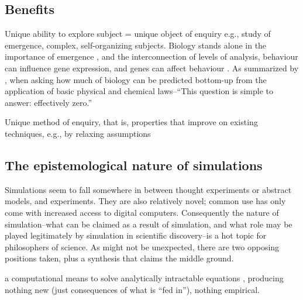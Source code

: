 
\subsection{Benefits}\label{benefits}

Unique ability to explore subject = unique object of enquiry e.g., study
of emergence, complex, self-organizing subjects. Biology stands alone in
the importance of emergence \autocite{Bersini:2006ve}, and the
interconnection of levels of analysis, \eg behaviour can influence gene
expression, and genes can affect behaviour \autocite{Krakauer2011}. As
summarized by \autocite{Krakauer2011}, when asking how much of biology
can be predicted bottom-up from the application of basic physical and
chemical laws--``This question is simple to answer: effectively zero.''

Unique method of enquiry, that is, properties that improve on existing
techniques, e.g., by relaxing assumptions

\subsection{The epistemological nature of simulations}\label{the-epistemological-nature-of-simulations}

Simulations seem to fall somewhere in between thought experiments or
abstract models, and experiments. They are also relatively novel; common
use has only come with increased access to digital computers.
Consequently the nature of simulation--what can be claimed as a result
of simulation, and what role may be played legitimately by simulation in
scientific discovery--is a hot topic for philosophers of science. As
might not be unexpected, there are two opposing positions taken, plus a
synthesis that claims the middle ground.

\label{simulations-are-just-calculators}

a computational means to solve analytically intractable equations
\autocite[31]{Winsberg2010}, producing nothing new (just consequences
of what is ``fed in''\autocite{DiPaolo2000}), nothing empirical.


